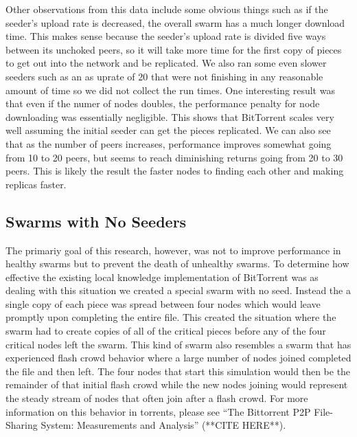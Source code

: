 Other observations from this data include some obvious things such as
if the seeder's upload rate is decreased, the overall swarm has a much
longer download time. This makes sense because the seeder's upload rate
is divided five ways between its unchoked peers, so it will take more
time for the first copy of pieces to get out into the network and be
replicated. We also ran some even slower seeders such as an as uprate
of 20 that were not finishing in any reasonable amount of time so we
did not collect the run times. One interesting result was that even if
the numer of nodes doubles, the performance penalty for node downloading
was essentially negligible. This shows that BitTorrent scales very well
assuming the initial seeder can get the pieces replicated.  We can also
see that as the number of peers increases, performance improves somewhat
going from 10 to 20 peers, but seems to reach diminishing returns going
from 20 to 30 peers. This is likely the result the faster nodes to
finding each other and making replicas faster.



\subsection{Swarms with No Seeders}

The primariy goal of this research, however, was not to improve
performance in healthy swarms but to prevent the death of unhealthy
swarms. To determine how effective the existing local knowledge
implementation of BitTorrent was as dealing with this situation we
created a special swarm with no seed. Instead the a single copy of
each piece was spread between four nodes which would leave promptly
upon completing the entire file. This created the situation where the
swarm had to create copies of all of the critical pieces before any of
the four critical nodes left the swarm. This kind of swarm also
resembles a swarm that has experienced flash crowd behavior where a
large number of nodes joined completed the file and then left. The
four nodes that start this simulation would then be the remainder of
that initial flash crowd while the new nodes joining would represent
the steady stream of nodes that often join after a flash crowd. For
more information on this behavior in torrents, please see 
``The Bittorrent  P2P File-Sharing System: Measurements and Analysis''
(**CITE HERE**). 

